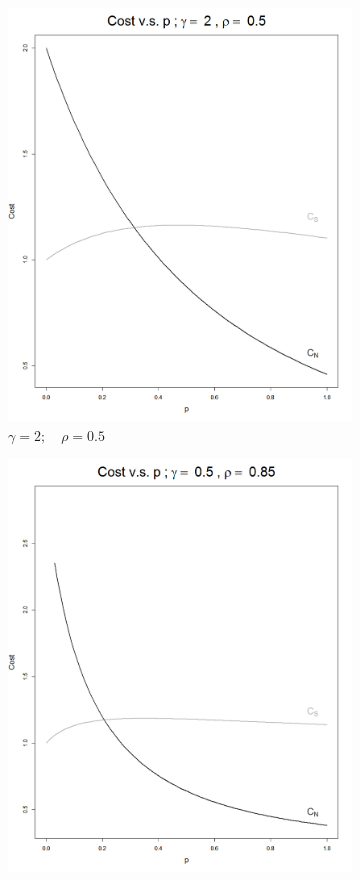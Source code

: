 \documentclass[11pt]{article}
\numberwithin{equation}{section}
\begin{document}
\begin{figure}[h!]
	\centering
	\begin{subfigure}[b]{0.49\textwidth}
		\includegraphics[width=\textwidth]{cost_vs_p_2_05}
		\caption{$\gamma=2;\quad\rho=0.5$}
	\label{cost_vs_p_2_05}
	\end{subfigure}
	\begin{subfigure}[b]{0.49\textwidth}
	\includegraphics[width=\textwidth]{cost_vs_p_05_085}

\end{subfigure}
\end{figure}
\end{document}
